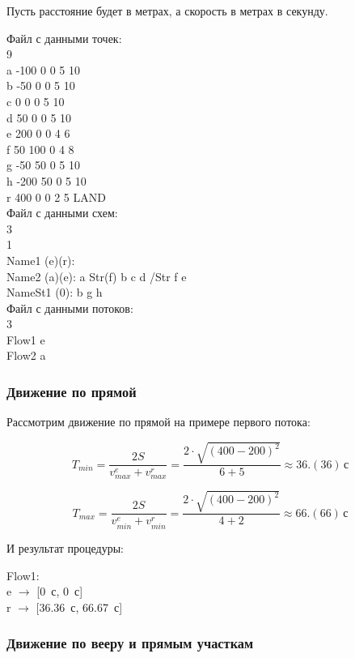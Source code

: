 \documentclass[12pt]{article}
\theoremstyle{plain}
\begin{document}
Пусть расстояние будет в метрах, а скорость в метрах в секунду.

\noindent Файл с данными точек:\\
9\\
a -100 0 0 5 10\\
b -50 0 0 5 10\\
c 0 0 0 5 10\\
d 50 0 0 5 10\\
e 200 0 0 4 6\\
f 50 100 0 4 8\\
g -50 50 0 5 10\\
h -200 50 0 5 10\\
r 400 0 0 2 5 LAND\\

\noindent Файл с данными схем:\\
3\\
1\\
Name1 (e)(r):\\
Name2 (a)(e): a Str(f) b c d /Str f e\\
NameSt1 (0): b g h\\

\noindent Файл с данными потоков:\\
3\\
Flow1 e\\
Flow2 a\\

\subsubsection{Движение по прямой}


Рассмотрим движение по прямой на примере первого потока:


$$
T_{min} = \frac{2S}{v_{max}^e + v_{max}^r} = \frac{2\cdot\sqrt{(400 - 200)^2}}{6 + 5} \approx 36.(36)\,\text{с}
$$

$$
T_{max} = \frac{2S}{v_{min}^e + v_{min}^r} = \frac{2\cdot\sqrt{(400 - 200)^2}}{4 + 2} \approx 66.(66)\,\text{с}
$$

И результат процедуры:

\noindent Flow1:\\
e $\rightarrow$ [0~с, 0~с]\\
r $\rightarrow$ [36.36~с, 66.67~с]



\subsubsection{Движение по вееру и прямым участкам}
\end{document}
